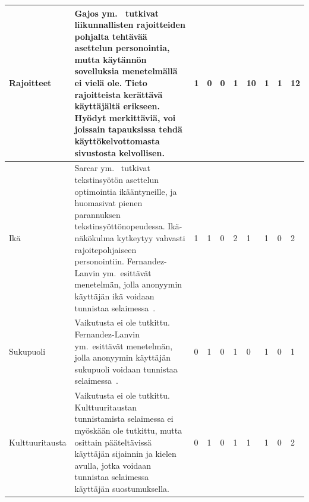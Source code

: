 \documentclass[finnish, 12pt, a4paper, elec, utf8, a-1b]{aaltothesis}
\begin{document}
{\begin{longtable}{p{2.5cm}|p{6cm}|p{0.5cm}p{0.5cm}p{0.5cm}|p{0.5cm}|p{0.5cm}p{0.5cm}p{0.5cm}|p{0.5cm}|}
    \midrule
    Rajoitteet                              & Gajos ym.~\cite{10.1145/1357054.1357250} tutkivat liikunnallisten rajoitteiden pohjalta tehtävää asettelun personointia, mutta käytännön sovelluksia menetelmällä ei vielä ole. Tieto rajoitteista kerättävä käyttäjältä erikseen. Hyödyt merkittäviä, voi joissain tapauksissa tehdä käyttökelvottomasta sivustosta kelvollisen.                                       & 1                                          & 0                                   & 0                                      & 1                            & 10                                              & 1                                         & 1                                         & 12                           \\
    \midrule
    Ikä                                     & Sarcar ym.~\cite{10.1145/2996267.2996275} tutkivat tekstinsyötön asettelun optimointia ikääntyneille, ja huomasivat pienen parannuksen tekstinsyöttönopeudessa. Ikä-näkökulma kytkeytyy vahvasti rajoitepohjaiseen personointiin. Fernandez-Lanvin ym.\ esittävät menetelmän, jolla anonyymin käyttäjän ikä voidaan tunnistaa selaimessa~\cite{fernandez2018dimension}. & 1                                          & 1                                   & 0                                      & 2                            & 1                                               & 1                                         & 0                                         & 2                            \\
    \midrule
    Sukupuoli                               & Vaikutusta ei ole tutkittu. Fernandez-Lanvin ym.\ esittävät menetelmän, jolla anonyymin käyttäjän sukupuoli voidaan tunnistaa selaimessa~\cite{fernandez2018dimension}.                                                                                                                                                                                                 & 0                                          & 1                                   & 0                                      & 1                            & 0                                               & 1                                         & 0                                         & 1                            \\
    \midrule
    Kulttuuritausta                         & Vaikutusta ei ole tutkittu. Kulttuuritaustan tunnistamista selaimessa ei myöskään ole tutkittu, mutta osittain pääteltävissä käyttäjän sijainnin ja kielen avulla, jotka voidaan tunnistaa selaimessa käyttäjän suostumuksella.                                                                                                                                         & 0                                          & 1                                   & 0                                      & 1                            & 1                                               & 1                                         & 0                                         & 2                            \\

\end{longtable}}
\end{document}
